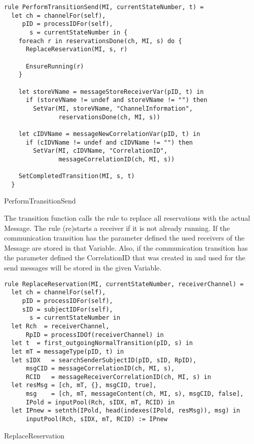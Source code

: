 \begin{listing}[htbp]
\begin{verbatim}
rule PerformTransitionSend(MI, currentStateNumber, t) =
  let ch = channelFor(self),
     pID = processIDFor(self),
       s = currentStateNumber in {
    foreach r in reservationsDone(ch, MI, s) do {
      ReplaceReservation(MI, s, r)

      EnsureRunning(r)
    }

    let storeVName = messageStoreReceiverVar(pID, t) in
      if (storeVName != undef and storeVName != "") then
        SetVar(MI, storeVName, "ChannelInformation",
               reservationsDone(ch, MI, s))

    let cIDVName = messageNewCorrelationVar(pID, t) in
      if (cIDVName != undef and cIDVName != "") then
        SetVar(MI, cIDVName, "CorrelationID",
               messageCorrelationID(ch, MI, s))

    SetCompletedTransition(MI, s, t)
  }
\end{verbatim}
\caption{PerformTransitionSend}
\label{lst:shortasm:PerformTransitionSend}
\end{listing}


The transition function calls the  rule to replace all reservations with the actual Message. The  rule (re)starts a receiver if it is not already running. If the communication transition has the parameter  defined the used receivers of the Message are stored in that Variable. Also, if the communication transition has the parameter  defined the CorrelationID that was created in  and used for the send messages will be stored in the given Variable.


\begin{listing}[htbp]
\begin{verbatim}
rule ReplaceReservation(MI, currentStateNumber, receiverChannel) =
  let ch = channelFor(self),
     pID = processIDFor(self),
     sID = subjectIDFor(self),
       s = currentStateNumber in
  let Rch  = receiverChannel,
      RpID = processIDOf(receiverChannel) in
  let t  = first_outgoingNormalTransition(pID, s) in
  let mT = messageType(pID, t) in
  let sIDX   = searchSenderSubjectID(pID, sID, RpID),
      msgCID = messageCorrelationID(ch, MI, s),
      RCID   = messageReceiverCorrelationID(ch, MI, s) in
  let resMsg = [ch, mT, {}, msgCID, true],
      msg    = [ch, mT, messageContent(ch, MI, s), msgCID, false],
      IPold = inputPool(Rch, sIDX, mT, RCID) in
  let IPnew = setnth(IPold, head(indexes(IPold, resMsg)), msg) in
      inputPool(Rch, sIDX, mT, RCID) := IPnew
\end{verbatim}
\caption{ReplaceReservation}
\label{lst:shortasm:ReplaceReservation}
\end{listing}


